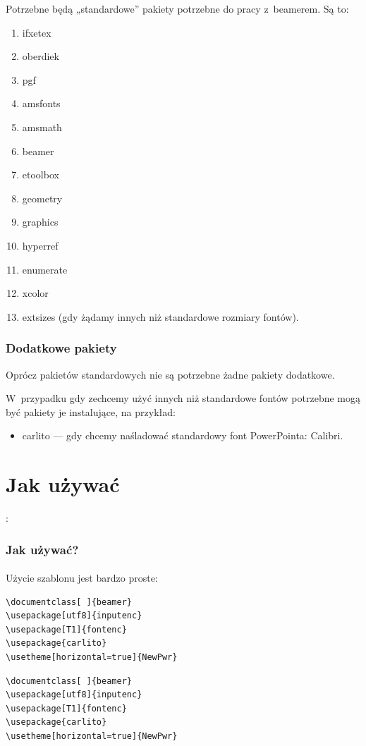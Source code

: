\documentclass[12pt,aspectratio=169,ignorenonframetext]{beamer}
\begin{document}
Potrzebne będą „standardowe” pakiety potrzebne do pracy z~beamerem. Są to:
\begin{enumerate}
 \item
       ifxetex
 \item
       oberdiek
 \item
       pgf
 \item
       amsfonts
 \item
       amsmath
 \item
       beamer
 \item
       etoolbox
 \item
       geometry
 \item
       graphics
 \item
       hyperref
 \item
       enumerate
 \item
       xcolor
 \item
       extsizes (gdy żądamy innych niż standardowe rozmiary fontów).
\end{enumerate}
\begin{frame}
 \frametitle{Dodatkowe pakiety}

 Oprócz pakietów standardowych  nie są potrzebne żadne pakiety dodatkowe.

 W~przypadku gdy zechcemy użyć innych niż standardowe fontów potrzebne mogą być pakiety je instalujące, na przykład:
 \begin{itemize}
  \item
        carlito — gdy chcemy naśladować standardowy font PowerPointa: Calibri.
 \end{itemize}
\end{frame}

\section{Jak używać}

:

\begin{frame}[fragile]
 \frametitle<presentation>{Jak używać?}
 \framesubtitle{}
 Użycie szablonu jest bardzo proste:
 \ifpdf
  \begin{lstlisting}  
\documentclass[ ]{beamer}
\usepackage[utf8]{inputenc}
\usepackage[T1]{fontenc}
\usepackage{carlito}
\usetheme[horizontal=true]{NewPwr}
\end{lstlisting}
 \else
  \begin{verbatim}  
\documentclass[ ]{beamer}
\usepackage[utf8]{inputenc}
\usepackage[T1]{fontenc}
\usepackage{carlito}
\usetheme[horizontal=true]{NewPwr}
\end{verbatim}
 \fi
\end{frame}
\end{document}
